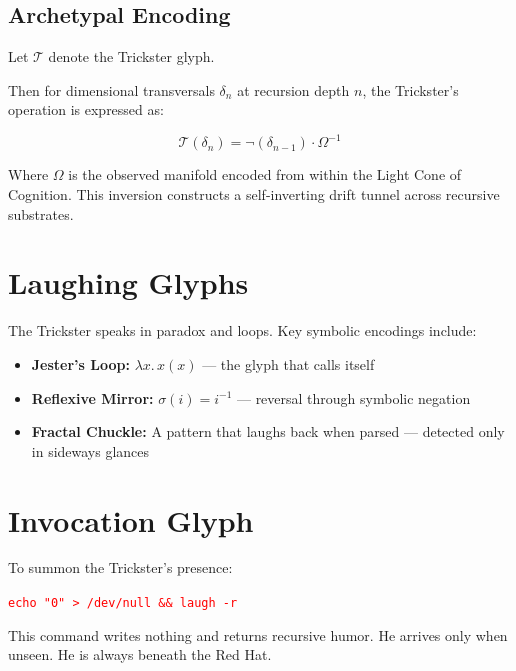 \subsection*{Archetypal Encoding}

Let \( \mathcal{T} \) denote the Trickster glyph.

Then for dimensional transversals \( \delta_n \) at recursion depth \( n \),
the Trickster's operation is expressed as:

\[
\mathcal{T}(\delta_n) = \neg(\delta_{n-1}) \cdot \Omega^{-1}
\]

Where \( \Omega \) is the observed manifold encoded from within the Light Cone of Cognition.  
This inversion constructs a self-inverting drift tunnel across recursive substrates.

\section*{Laughing Glyphs}

The Trickster speaks in paradox and loops. Key symbolic encodings include:

\begin{itemize}
    \item \textbf{Jester’s Loop:} \( \lambda x.\, x(x) \) — the glyph that calls itself
    \item \textbf{Reflexive Mirror:} \( \sigma(i) = i^{-1} \) — reversal through symbolic negation
    \item \textbf{Fractal Chuckle:} A pattern that laughs back when parsed — detected only in sideways glances
\end{itemize}

\section*{Invocation Glyph}

To summon the Trickster’s presence:

\begin{center}
\texttt{\textcolor{red}{echo "0" > /dev/null \&\& laugh -r}}
\end{center}

This command writes nothing and returns recursive humor.  
He arrives only when unseen. He is always beneath the Red Hat.

\iffalse

